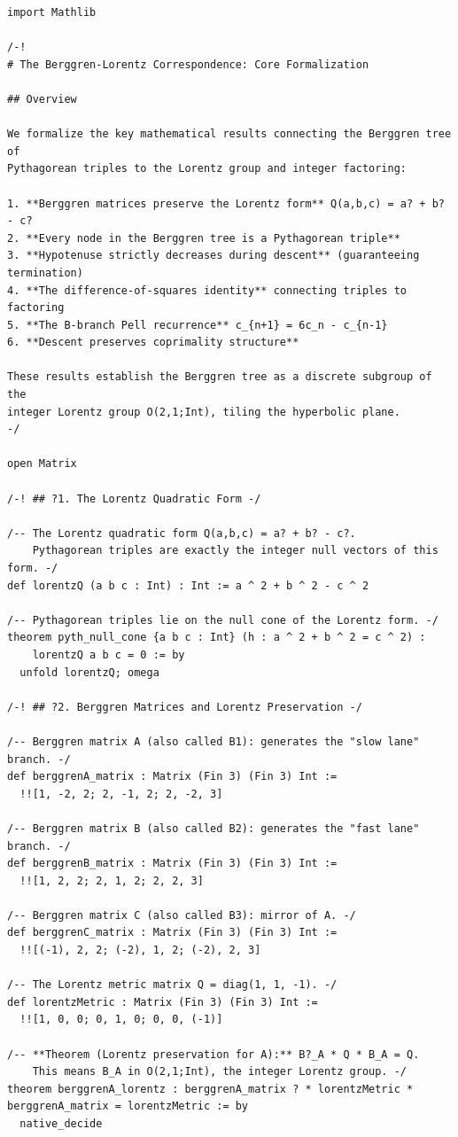 \documentclass[11pt,twoside,openright]{book}
\theoremstyle{definition}
\theoremstyle{remark}
\begin{document}
\begin{lstlisting}[style=lean]
import Mathlib

/-!
# The Berggren-Lorentz Correspondence: Core Formalization

## Overview

We formalize the key mathematical results connecting the Berggren tree of
Pythagorean triples to the Lorentz group and integer factoring:

1. **Berggren matrices preserve the Lorentz form** Q(a,b,c) = a? + b? - c?
2. **Every node in the Berggren tree is a Pythagorean triple**
3. **Hypotenuse strictly decreases during descent** (guaranteeing termination)
4. **The difference-of-squares identity** connecting triples to factoring
5. **The B-branch Pell recurrence** c_{n+1} = 6c_n - c_{n-1}
6. **Descent preserves coprimality structure**

These results establish the Berggren tree as a discrete subgroup of the
integer Lorentz group O(2,1;Int), tiling the hyperbolic plane.
-/

open Matrix

/-! ## ?1. The Lorentz Quadratic Form -/

/-- The Lorentz quadratic form Q(a,b,c) = a? + b? - c?.
    Pythagorean triples are exactly the integer null vectors of this form. -/
def lorentzQ (a b c : Int) : Int := a ^ 2 + b ^ 2 - c ^ 2

/-- Pythagorean triples lie on the null cone of the Lorentz form. -/
theorem pyth_null_cone {a b c : Int} (h : a ^ 2 + b ^ 2 = c ^ 2) :
    lorentzQ a b c = 0 := by
  unfold lorentzQ; omega

/-! ## ?2. Berggren Matrices and Lorentz Preservation -/

/-- Berggren matrix A (also called B1): generates the "slow lane" branch. -/
def berggrenA_matrix : Matrix (Fin 3) (Fin 3) Int :=
  !![1, -2, 2; 2, -1, 2; 2, -2, 3]

/-- Berggren matrix B (also called B2): generates the "fast lane" branch. -/
def berggrenB_matrix : Matrix (Fin 3) (Fin 3) Int :=
  !![1, 2, 2; 2, 1, 2; 2, 2, 3]

/-- Berggren matrix C (also called B3): mirror of A. -/
def berggrenC_matrix : Matrix (Fin 3) (Fin 3) Int :=
  !![(-1), 2, 2; (-2), 1, 2; (-2), 2, 3]

/-- The Lorentz metric matrix Q = diag(1, 1, -1). -/
def lorentzMetric : Matrix (Fin 3) (Fin 3) Int :=
  !![1, 0, 0; 0, 1, 0; 0, 0, (-1)]

/-- **Theorem (Lorentz preservation for A):** B?_A * Q * B_A = Q.
    This means B_A in O(2,1;Int), the integer Lorentz group. -/
theorem berggrenA_lorentz : berggrenA_matrix ? * lorentzMetric * berggrenA_matrix = lorentzMetric := by
  native_decide


\end{lstlisting}
\end{document}
